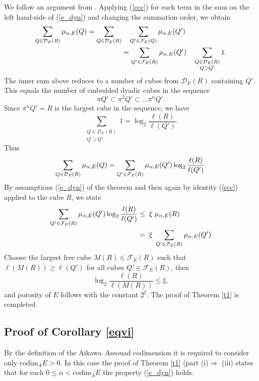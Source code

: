 \documentclass[12pt]{amsart} \setlength{\textwidth}{15cm} \setlength{\textheight}{24cm} \setlength{\voffset}{-1cm} \setlength{\oddsidemargin}{-0.4cm} \setlength{\evensidemargin}{-0.4cm}
\theoremstyle{definition}
\theoremstyle{remark}
\begin{document}
 We follow an argument from \cite[Proposition 1]{V}.
Applying   (\ref{ccc}) for each term in the  sum on the left hand-side of (\ref{e_dyn}) and
 changing the summation order, we obtain
\[
\aligned
\sum _ {Q \in \mathcal{D}_E(R)}\mu_{\alpha,E}(Q)
=\sum_ {Q \in \mathcal{D}_E(R)}& \quad\sum_{ Q' \in \mathcal{F}_E(Q)  } \mu_{\alpha,E}( Q') \\
&=\sum_ {Q'\in \mathcal {F}_E(R)} \mu_{\alpha,E}( Q') \quad\sum_{ \substack { Q \in  \mathcal{D}_E(R)\\
  Q\supset Q'}} 1 .
\endaligned
\]
The inner sum above
  reduces to a number  of cubes from $\mathcal{D}_E(R)$ containing $Q'$. This equals  the  number of embedded dyadic cubes  in the sequence
  \[  \pi Q'\subset \pi^2 Q'\subset \dots \pi^n Q'.\]
Since   $\pi^n Q' = R$ is the largest cube in the sequence, we have
\[
 \sum_{ \substack { Q \in  \mathcal{D}_E(R)\\
  Q\supset Q'}} 1  = \log_2 \frac{\ell(R)}{\ell(Q')}.
\]
Thus
\[
\aligned
\sum _ {Q \in \mathcal{D}_E(R)}\mu_{\alpha,E}(Q)
&=\sum_ {Q'\in \mathcal {F}_E(R)} \mu_{\alpha,E}( Q') \log_2 \frac{\ell(R)}{\ell(Q')}.\\
\endaligned
\]
     By assumptions  (\ref{e_dyn}) of the  theorem and then again by identity (\ref{ccc}) applied to the cube $R$, we state
\[
\aligned
\sum_ {Q'\in \mathcal {F}_E(R)} \mu_{\alpha,E}( Q') \log_2 \frac{\ell(R)}{\ell(Q')}
& \leq \; \xi\; \mu_{\alpha,E}(R)\\
& = \;\xi\; \sum_ {Q'\in \mathcal {F}_E(R)} \mu_{\alpha,E}( Q')
\endaligned
\]
Choose   the largest free cube  $M(R) \in \mathcal{F}_E(R)$  such that $\ell(M(R)) \geq \ell(Q')$ for all cubes $ Q'\in \mathcal {F}_E(R)$, then
\[\log_2 \frac{\ell(R)}{\ell(M(R))}\leq \xi, \]
 and porosity of $E$ follows with the constant $2^\xi$.
The proof of Theorem   \ref{t1} is completed.


\subsection{Proof of Corollary \ref{eqvi}}
  By the definition of the Aikawa--Assouad codimension it is required to consider only  $\mathrm{codim}_A E >0$.
 In this case the proof of Theorem \ref{t1} (part (i)$\Rightarrow$ (iii) states   that for each $0\leq \alpha <\mathrm{codim}_A E$ the
property   (\ref{e_dyn}) holds.
\end{document}

